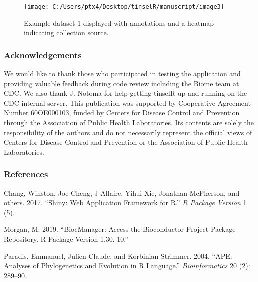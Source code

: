 \documentclass[
]{article}
\begin{document}
\begin{figure}

{\centering \texttt{[image: C:/Users/ptx4/Desktop/tinselR/manuscript/image3]} 

}

\caption{Example dataset 1 displayed with annotations and a heatmap indicating collection source.}\label{fig:fig1}
\end{figure}

\break

\hypertarget{acknowledgements}{%
\subsubsection{Acknowledgements}\label{acknowledgements}}

We would like to thank those who participated in testing the application
and providing valuable feedback during code review including the Biome
team at CDC. We also thank J. Notoma for help getting tinselR up and
running on the CDC internal server. This publication was supported by
Cooperative Agreement Number 60OE000103, funded by Centers for Disease
Control and Prevention through the Association of Public Health
Laboratories. Its contents are solely the responsibility of the authors
and do not necessarily represent the official views of Centers for
Disease Control and Prevention or the Association of Public Health
Laboratories.

\break

\hypertarget{references}{%
\subsubsection*{References}\label{references}}

\hypertarget{refs}{}
\leavevmode\hypertarget{ref-chang2017shiny}{}%
Chang, Winston, Joe Cheng, J Allaire, Yihui Xie, Jonathan McPherson, and
others. 2017. ``Shiny: Web Application Framework for R.'' \emph{R
Package Version} 1 (5).

\leavevmode\hypertarget{ref-morgan2019biocmanager}{}%
Morgan, M. 2019. ``BiocManager: Access the Bioconductor Project Package
Repository. R Package Version 1.30. 10.''

\leavevmode\hypertarget{ref-paradis2004ape}{}%
Paradis, Emmanuel, Julien Claude, and Korbinian Strimmer. 2004. ``APE:
Analyses of Phylogenetics and Evolution in R Language.''
\emph{Bioinformatics} 20 (2): 289--90.
\end{document}
